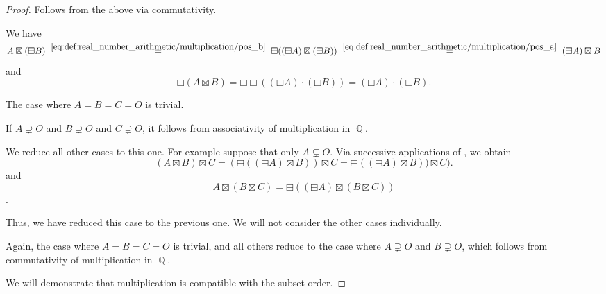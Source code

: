 \begin{proof}
   Follows from the above via commutativity.

   We have
  \begin{equation*}
    A \boxtimes (\boxminus B)
    \reloset {\eqref{eq:def:real_number_arithmetic/multiplication/pos_b}} =
    \boxminus ((\boxminus A) \boxtimes (\boxminus B))
    \reloset {\eqref{eq:def:real_number_arithmetic/multiplication/pos_a}} =
    (\boxminus A) \boxtimes B
  \end{equation*}
  and
  \begin{equation*}
    \boxminus(A \boxtimes B)
    =
    \boxminus \boxminus ((\boxminus A) \cdot (\boxminus B))
    =
    (\boxminus A) \cdot (\boxminus B).
  \end{equation*}

   The case where \( A = B = C = O \) is trivial.

  If \( A \supsetneq O \) and \( B \supsetneq O \) and \( C \supsetneq O \), it follows from associativity of multiplication in \( \BbbQ \).

  We reduce all other cases to this one. For example suppose that only \( A \subsetneq O \). Via successive applications of , we obtain
  \begin{equation*}
    (A \boxtimes B) \boxtimes C
    =
    (\boxminus ((\boxminus A) \boxtimes B)) \boxtimes C
    =
    \boxminus ((\boxminus A) \boxtimes B)) \boxtimes C).
  \end{equation*}
  and
  \begin{equation*}
    A \boxtimes (B \boxtimes C)
    =
    \boxminus ((\boxminus A) \boxtimes (B \boxtimes C))
  \end{equation*}.

  Thus, we have reduced this case to the previous one. We will not consider the other cases individually.

   Again, the case where \( A = B = C = O \) is trivial, and all others reduce to the case where \( A \supsetneq O \) and \( B \supsetneq O \), which follows from commutativity of multiplication in \( \BbbQ \).

   We will demonstrate that multiplication is compatible with the subset order.


\end{proof}
